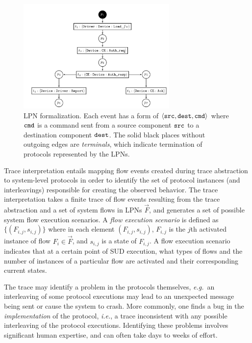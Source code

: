 \documentclass[12pt,frontmatter,copyright,thesis]{usfmanus}
\newcommand{\eg}{\mbox{{\em e.g.}}}
\newcommand{\ie}{\mbox{{\em i.e.}}}
\begin{document}
\begin{figure}
\label{changedb}
\centering
    \includegraphics[width=0.7\textwidth]{try}
  \caption{LPN formalization.
  Each event has a form of $\langle {\tt src, dest, cmd}
  \rangle$ where ${\tt cmd}$ is a command sent from a source
  component ${\tt src}$ to a destination component ${\tt
    dest}$. The solid black places without outgoing edges
  are {\em terminals}, which indicate termination of
  protocols represented by the LPNs.}
\end{figure}

Trace interpretation entails mapping flow events created
during trace abstraction to system-level protocols in order
to identify the set of protocol instances (and
interleavings) responsible for creating the observed
behavior. The trace interpretation takes a finite trace of flow events
 resulting from the trace abstraction and a set of system
 flows in LPNs $\vec{F}$, and generates a set of possible
 system flow execution scenarios.  A \emph{flow execution
   scenario} is defined as $\{(F_{i,j}, s_{i,j})\}$ where in
 each element $(F_{i,j}, s_{i,j})$, $F_{i,j}$ is the $j$th
 activated instance of flow $F_i \in \vec{F}$, and $s_{i,j}$
 is a state of $F_{i,j}$.  A flow execution scenario
 indicates that at a certain point of SUD execution, what
 types of flows and the number of instances of a particular
 flow are activated and their corresponding current states.

The trace may identify a problem in the protocols
themselves, \eg~an interleaving of some protocol executions
may lead to an unexpected message being sent or cause the
system to crash.  More commonly, one finds a bug in the {\em
  implementation} of the protocol, \ie, a trace inconsistent
with any possible interleaving of the protocol executions.
Identifying these problems involves significant human
expertise, and can often take days to weeks of effort.
\end{document}
